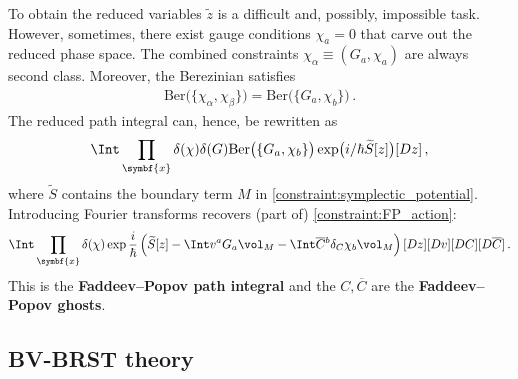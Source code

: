     To obtain the reduced variables $\widetilde{z}$ is a difficult and, possibly, impossible task. However, sometimes, there exist gauge conditions $\chi_a=0$ that carve out the reduced phase space. The combined constraints $\chi_\alpha\equiv(G_a,\chi_a)$ are always second class. Moreover, the Berezinian satisfies
    \begin{gather}
        \mathrm{Ber}\bigl(\{\chi_\alpha,\chi_\beta\}\bigr) = \mathrm{Ber}\bigl(\{G_a,\chi_b\}\bigr)\,.
    \end{gather}
    The reduced path integral can, hence, be rewritten as
    \begin{gather}
        \Int\prod_{\symbf{x}}\delta(\chi)\delta(G)\mathrm{Ber}\bigl(\{G_a,\chi_b\}\bigr)\exp\bigl(i/\hbar \widetilde{S}[z]\bigr)[Dz]\,,
    \end{gather}
    where $\widetilde{S}$ contains the boundary term $M$ in \cref{constraint:symplectic_potential}. Introducing Fourier transforms recovers (part of) \cref{constraint:FP_action}:
    \begin{gather}
        \Int\prod_{\symbf{x}}\delta(\chi)\exp\frac{i}{\hbar}\left(\widetilde{S}[z]-\Int v^aG_a\vol_M-\Int\overline{C}\vphantom{C}^b\delta_C\chi_b\vol_M\right)[Dz][Dv][DC][D\overline{C}]\,.
    \end{gather}
    This is the \textbf{Faddeev--Popov path integral} and the $C,\overline{C}$ are the \textbf{Faddeev--Popov ghosts}.

\subsection{BV-BRST theory}

